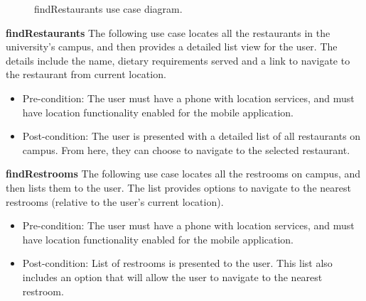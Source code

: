 \documentclass[12pt,a4paper]{article}
\begin{document}
			\medskip

			\begin{figure}[ht!]
				\caption \newline findRestaurants use case diagram.
			\end{figure}

			\textbf{findRestaurants}
			The following use case locates all the restaurants in the university's campus, and then provides a detailed list 				view for the user. The details include the name, dietary requirements served and a link to navigate to the 						restaurant from current location.

			\begin{itemize}
			\item Pre-condition: The user must have a phone with location services, and must have location functionality        				  enabled for the mobile application.
			\item Post-condition: The user is presented with a detailed list of all restaurants on campus. From here, they can 				  choose to navigate to the selected restaurant.
			\end{itemize}

			\textbf{findRestrooms}
			The following use case locates all the restrooms on campus, and then lists them to the user. The list provides     			options to navigate to the nearest restrooms (relative to the user's current location).

			\begin{itemize}
			\item Pre-condition: The user must have a phone with location services, and must have location functionality  						  enabled for the mobile application.
			\item Post-condition: List of restrooms is presented to the user. This list also includes an option that will 						  allow the user to navigate to the nearest restroom.
			\end{itemize}
\end{document}
